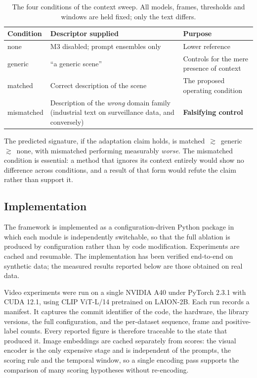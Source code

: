 \documentclass[a4paper,fleqn]{cas-sc}
\begin{document}
\begin{table}[width=\linewidth,cols=3,pos=htbp]
\caption{The four conditions of the context sweep. All models, frames,
thresholds and windows are held fixed; only the text differs.}
\label{tbl:variants}
\begin{tabularx}{\linewidth}{@{}l Z Z@{}}
\toprule
\textbf{Condition} & \textbf{Descriptor supplied} & \textbf{Purpose} \\
\midrule
none       & M3 disabled; prompt ensembles only & Lower reference \\
generic    & ``a generic scene''                & Controls for the mere presence of context \\
matched    & Correct description of the scene   & The proposed operating condition \\
mismatched & Description of the \emph{wrong} domain family (industrial text on surveillance data, and conversely) & \textbf{Falsifying control} \\
\bottomrule
\end{tabularx}
\end{table}

The predicted signature, if the adaptation claim holds, is
matched~$\gtrsim$~generic~$\gtrsim$~none, with mismatched performing measurably
\emph{worse}. The mismatched condition is essential: a method that ignores its
context entirely would show no difference across conditions, and a result of that
form would refute the claim rather than support it.

\subsection{Implementation}
The framework is implemented as a configuration-driven Python package in which
each module is independently switchable, so that the full ablation is produced by
configuration rather than by code modification. Experiments are cached and
resumable. The implementation has been verified end-to-end on synthetic data; the
measured results reported below are those obtained on real data.

Video experiments were run on a single NVIDIA A40 under PyTorch 2.3.1 with CUDA
12.1, using CLIP ViT-L/14 pretrained on LAION-2B. Each run records a manifest. It captures the
commit identifier of the code, the hardware, the library versions, the full
configuration, and the per-dataset sequence, frame and positive-label counts.
Every reported figure is therefore traceable to the state that produced it. Image embeddings are cached separately from scores: the visual encoder is
the only expensive stage and is independent of the prompts, the scoring rule and
the temporal window, so a single encoding pass supports the comparison of many
scoring hypotheses without re-encoding.
\end{document}
